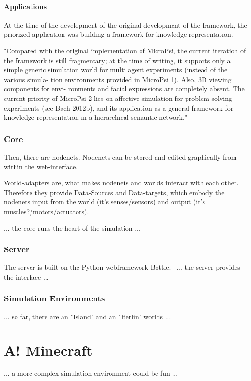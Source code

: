                 \paragraph{Applications}
At the time of the development of the original development of the framework, the priorized application was building a framework for knowledge representation.~\cite{conf/agi/Bach12}

"Compared with the original implementation of MicroPsi, the current iteration of the framework is still fragmentary; at the time of writing, it supports only a simple generic simulation world for multi agent experiments (instead of the various simula- tion environments provided in MicroPsi 1). Also, 3D viewing components for envi- ronments and facial expressions are completely absent.
The current priority of MicroPsi 2 lies on affective simulation for problem solving experiments (see Bach 2012b), and its application as a general framework for knowledge representation in a hierarchical semantic network."~\cite{conf/agi/Bach12}


            \subsubsection{Core}
Then, there are nodenets. Nodenets can be stored and edited graphically from within the web-interface.

World-adapters are, what makes nodenets and worlds interact with each other. Therefore they provide Data-Sources and Data-targets, which embody the nodenets input from the world (it's senses/sensors) and output (it's muscles?/motors/actuators).

... the core runs the heart of the simulation ...

            \subsubsection{Server}
The server is built on the Python webframework Bottle.~\cite{conf/agi/Bach12}
... the server provides the interface ...

            \subsubsection{Simulation Environments}
... so far, there are an "Island" and an "Berlin" worlds ...

    \section{A! Minecraft}
... a more complex simulation environment could be fun ...

